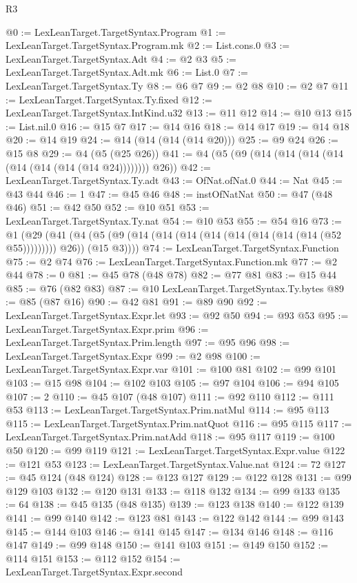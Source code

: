 \begin{lexlean}{R3}
\begin{coremodule}
@0 := LexLeanTarget.TargetSyntax.Program
@1 := LexLeanTarget.TargetSyntax.Program.mk
@2 := List.cons.{0}
@3 := LexLeanTarget.TargetSyntax.Adt
@4 := @2 @3
@5 := LexLeanTarget.TargetSyntax.Adt.mk
@6 := List.{0}
@7 := LexLeanTarget.TargetSyntax.Ty
@8 := @6 @7
@9 := @2 @8
@10 := @2 @7
@11 := LexLeanTarget.TargetSyntax.Ty.fixed
@12 := LexLeanTarget.TargetSyntax.IntKind.u32
@13 := @11 @12
@14 := @10 @13
@15 := List.nil.{0}
@16 := @15 @7
@17 := @14 @16
@18 := @14 @17
@19 := @14 @18
@20 := @14 @19
@24 := @14 (@14 (@14 (@14 @20)))
@25 := @9 @24
@26 := @15 @8
@29 := @4 (@5 (@25 @26))
@41 := @4 (@5 (@9 (@14 (@14 (@14 (@14 (@14 (@14 (@14 (@14 @24)))))))) @26))
@42 := LexLeanTarget.TargetSyntax.Ty.adt
@43 := OfNat.ofNat.{0}
@44 := Nat
@45 := @43 @44
@46 := 1
@47 := @45 @46
@48 := instOfNatNat
@50 := @47 (@48 @46)
@51 := @42 @50
@52 := @10 @51
@53 := LexLeanTarget.TargetSyntax.Ty.nat
@54 := @10 @53
@55 := @54 @16
@73 := @1
    (@29
      (@41 (@4 (@5 (@9 (@14 (@14 (@14 (@14 (@14 (@14 (@14 (@14 (@52 @55))))))))) @26)) (@15 @3))))
@74 := LexLeanTarget.TargetSyntax.Function
@75 := @2 @74
@76 := LexLeanTarget.TargetSyntax.Function.mk
@77 := @2 @44
@78 := 0
@81 := @45 @78 (@48 @78)
@82 := @77 @81
@83 := @15 @44
@85 := @76 (@82 @83)
@87 := @10 LexLeanTarget.TargetSyntax.Ty.bytes
@89 := @85 (@87 @16)
@90 := @42 @81
@91 := @89 @90
@92 := LexLeanTarget.TargetSyntax.Expr.let
@93 := @92 @50
@94 := @93 @53
@95 := LexLeanTarget.TargetSyntax.Expr.prim
@96 := LexLeanTarget.TargetSyntax.Prim.length
@97 := @95 @96
@98 := LexLeanTarget.TargetSyntax.Expr
@99 := @2 @98
@100 := LexLeanTarget.TargetSyntax.Expr.var
@101 := @100 @81
@102 := @99 @101
@103 := @15 @98
@104 := @102 @103
@105 := @97 @104
@106 := @94 @105
@107 := 2
@110 := @45 @107 (@48 @107)
@111 := @92 @110
@112 := @111 @53
@113 := LexLeanTarget.TargetSyntax.Prim.natMul
@114 := @95 @113
@115 := LexLeanTarget.TargetSyntax.Prim.natQuot
@116 := @95 @115
@117 := LexLeanTarget.TargetSyntax.Prim.natAdd
@118 := @95 @117
@119 := @100 @50
@120 := @99 @119
@121 := LexLeanTarget.TargetSyntax.Expr.value
@122 := @121 @53
@123 := LexLeanTarget.TargetSyntax.Value.nat
@124 := 72
@127 := @45 @124 (@48 @124)
@128 := @123 @127
@129 := @122 @128
@131 := @99 @129 @103
@132 := @120 @131
@133 := @118 @132
@134 := @99 @133
@135 := 64
@138 := @45 @135 (@48 @135)
@139 := @123 @138
@140 := @122 @139
@141 := @99 @140
@142 := @123 @81
@143 := @122 @142
@144 := @99 @143
@145 := @144 @103
@146 := @141 @145
@147 := @134 @146
@148 := @116 @147
@149 := @99 @148
@150 := @141 @103
@151 := @149 @150
@152 := @114 @151
@153 := @112 @152
@154 := LexLeanTarget.TargetSyntax.Expr.second

\end{coremodule}
\end{lexlean}
